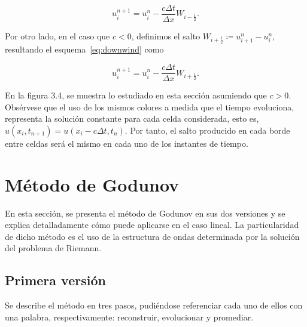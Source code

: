 \begin{equation*}
  u^{n+1}_{i}=
  u^{n}_{i}-
  \frac{c\Delta t}{\Delta x}
  W_{i-\frac{1}{2}}.
\end{equation*}

Por otro lado, en el caso que $c<0$, definimos el salto
$W_{i+\frac{1}{2}}\coloneqq u^{n}_{i+1}-u^{n}_{i}$, resultando el
esquema~\eqref{eq:downwind} como

\begin{equation*}
  u^{n+1}_{i}=
  u^{n}_{i}-
  \frac{c\Delta t}{\Delta x}
  W_{i+\frac{1}{2}}.
\end{equation*}

En la figura 3.4, se muestra lo estudiado en esta sección asumiendo
que $c>0$.
Obsérvese que el uso de los mismos colores a medida que el tiempo
evoluciona, representa la solución constante para cada celda
considerada, esto es,
\begin{math}
  u
  \left(
  x_{i},
  t_{n+1}
  \right)=
  u
  \left(
  x_{i}-c\Delta t,
  t_{n}
  \right)
\end{math}.
Por tanto, el salto producido en cada borde entre celdas será el
mismo en cada uno de los instantes de tiempo.

\section{Método de Godunov}

En esta sección, se presenta el método de Godunov en sus dos
versiones y se explica detalladamente cómo puede aplicarse en el
caso lineal.
La particularidad de dicho método es el uso de la estructura de ondas
determinada por la solución del problema de Riemann.

\subsection{Primera versión}

Se describe el método en tres pasos, pudiéndose referenciar cada uno
de ellos con una palabra, respectivamente: reconstruir, evolucionar
y promediar.

